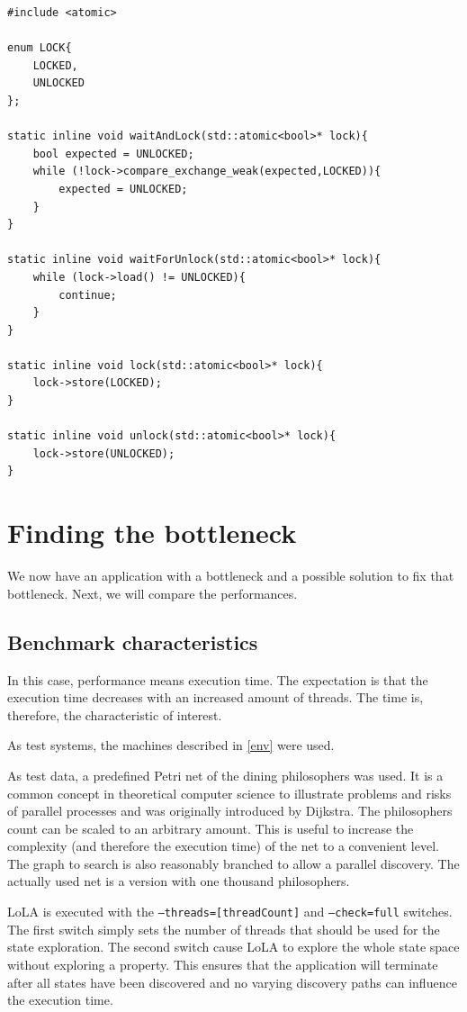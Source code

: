 \begin{lstlisting}
#include <atomic>

enum LOCK{
    LOCKED,
    UNLOCKED
};

static inline void waitAndLock(std::atomic<bool>* lock){
    bool expected = UNLOCKED;
    while (!lock->compare_exchange_weak(expected,LOCKED)){
        expected = UNLOCKED;
    }
}

static inline void waitForUnlock(std::atomic<bool>* lock){
    while (lock->load() != UNLOCKED){
        continue;
    }
}

static inline void lock(std::atomic<bool>* lock){
    lock->store(LOCKED);
}

static inline void unlock(std::atomic<bool>* lock){
    lock->store(UNLOCKED);
}
\end{lstlisting}

\section{Finding the bottleneck}
We now have an application with a bottleneck and a possible solution to fix that bottleneck. Next, we will compare the performances.

\subsection{Benchmark characteristics}
In this case, performance means execution time. The expectation is that the execution time decreases with an increased amount of threads. The time is, therefore, the characteristic of interest.

As test systems, the machines described in \ref{env} were used.

As test data, a predefined Petri net of the dining philosophers was used. It is a common concept in theoretical computer science to illustrate problems and risks of parallel processes and was originally introduced by Dijkstra\cite{dijkstra1971hierarchical}. The philosophers count can be scaled to an arbitrary amount. This is useful to increase the complexity (and therefore the execution time) of the net to a convenient level. The graph to search is also reasonably branched to allow a parallel discovery. The actually used net is a version with one thousand philosophers.

LoLA is executed with the \texttt{--threads=[threadCount]} and \texttt{--check=full} switches. The first switch simply sets the number of threads that should be used for the state exploration. The second switch cause LoLA to explore the whole state space without exploring a property. This ensures that the application will terminate after all states have been discovered and no varying discovery paths can influence the execution time.

